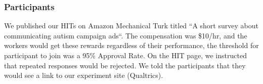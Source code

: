 \subsubsection{Participants}
We published our HITs on Amazon Mechanical Turk titled ``A short survey about communicating autism campaign ads``. The compensation was \$10/hr, and the workers would get these rewards regardless of their performance, the threshold for participant to join was a 95\% Approval Rate. On the HIT page, we instructed that repeated responses would be rejected. We told the participants that they would see a link to our experiment site (Qualtrics).
